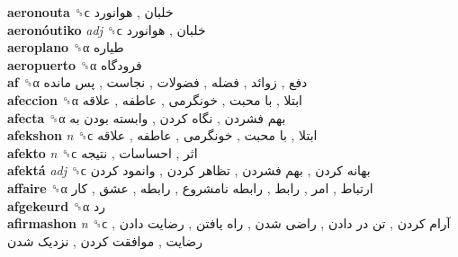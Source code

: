 \textbf{aeronouta} ␝ϲ   خلبان ,  هوانورد   \\
\textbf{aeronóutiko} \emph{adj}  ␝ϲ   خلبان ,  هوانورد   \\
\textbf{aeroplano} ␝α   طیاره   \\
\textbf{aeropuerto} ␝α   فرودگاه   \\
\textbf{af} ␝α   دفع ,  زوائد ,  فضله ,  فضولات ,  نجاست ,  پس مانده   \\
\textbf{afeccion} ␝α   ابتلا ,  با محبت ,  خونگرمی ,  عاطفه ,  علاقه   \\
\textbf{afecta} ␝α   بهم فشردن ,  نگاه کردن ,  وابسته بودن به   \\
\textbf{afekshon} \emph{n}  ␝ϲ   ابتلا ,  با محبت ,  خونگرمی ,  عاطفه ,  علاقه   \\
\textbf{afekto} \emph{n}  ␝ϲ   اثر ,  احساسات ,  نتیجه   \\
\textbf{afektá} \emph{adj}  ␝ϲ   بهانه کردن ,  بهم فشردن ,  تظاهر کردن ,  وانمود کردن   \\
\textbf{affaire} ␝α   ارتباط ,  امر ,  رابط ,  رابطه نامشروع ,  رابطه ,  عشق ,  کار   \\
\textbf{afgekeurd} ␝α   رد   \\
\textbf{afirmashon} \emph{n}  ␝ϲ   آرام کردن ,  تن در دادن ,  راضی شدن ,  راه یافتن ,  رضایت دادن ,  رضایت ,  موافقت کردن ,  نزدیک شدن   \\

